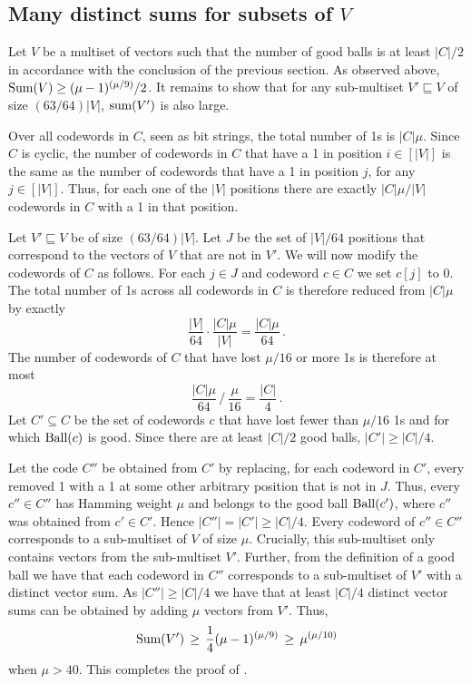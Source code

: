 \documentclass{toc}
\newcommand{\ball}[1]{\ensuremath{\textup{Ball}(#1)}}
\newcommand{\Vsum}{\ensuremath{\textup{Sum}}}
\newcommand{\vsum}{\ensuremath{\textup{sum}}}
\newcommand{\ELL}{\ensuremath{\mu}}
\begin{document}
\subsection{Many distinct sums for subsets of \texorpdfstring{$V$}{V}}

Let $V$ be a multiset of vectors such that the number of good balls is at least $|C|/2$ in accordance with the conclusion of the previous section. As observed above, $\Vsum(V)\geq (\ELL-1)^{(\ELL/9)}/2$. 
It remains to show that for any sub-multiset $V' \sqsubseteq V$ of size $(63/64)|V|$, $\vsum(V')$ is also large.

Over all codewords in $C$, seen as bit strings, the total number of 1s is $|C|\ELL$. Since $C$ is cyclic, the number of codewords in $C$ that have a 1 in position $i\in [|V|]$ is the same as the number of codewords that have a 1 in position $j$, for any $j\in [|V|]$.
Thus, for each one of the $|V|$ positions there are exactly $|C|\ELL/|V|$ codewords in $C$ with a 1 in that position.

Let $V'\sqsubseteq V$ be of size $(63/64)|V|$. Let $J$ be the set of $|V|/64$ positions that correspond to the vectors of $V$ that are not in $V'$.
We will now modify the codewords of $C$ as follows.
For each $j\in J$ and codeword $c\in C$ we
set $c[j]$ to 0.
The total number of 1s across all codewords in $C$ is therefore reduced from $|C|\mu$ by exactly
\[
\frac{|V|}{64} \cdot
\frac{|C|\ELL}{|V|} = \frac{|C|\ELL}{64}\,.
\]
The number of codewords of $C$ that have lost $\ELL/16$ or more 1s is
therefore at most
\[
\frac{|C|\ELL}{64}\,\Big/\,\frac{\ELL}{16}=\frac{|C|}4\,.
\]
Let $C'\subseteq C$ be the set of codewords $c$
that have lost fewer than $\ELL/16$ 1s and for which $\ball{c}$ is good. Since there are at least $|C|/2$
good balls, $|C'|\geq |C|/4$.

Let the code $C''$ be obtained from $C'$ by replacing, for each codeword in $C'$, every removed 1 with a 1 at some other arbitrary position that is not in $J$.
Thus, every $c''\in C''$ has Hamming weight $\ELL$ and belongs to the good ball $\ball{c'}$, where $c''$ was obtained from $c'\in C'$.
Hence $|C''|=|C'|\geq |C|/4$. Every codeword of $c'' \in C''$ corresponds to a sub-multiset of $V$ of size $\ELL$. Crucially, this sub-multiset only contains vectors from the sub-multiset $V'$. Further, from the definition of a good ball we have that each codeword in $C''$ corresponds to a sub-multiset of $V'$ with a distinct vector sum. As $|C''|\geq |C|/4$ we have that at least $|C|/4$ distinct vector sums can be
obtained by adding $\ELL$ vectors from $V'$.
Thus,
\[
\Vsum(V')
\,\geq\,
\frac14 (\ELL-1)^{(\ELL/9)}
\,\geq\,
\ELL^{(\ELL/10)}
\]
when $\ELL>40$. This completes the proof of .
\end{document}
